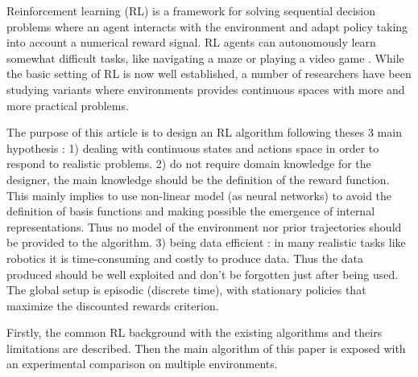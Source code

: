Reinforcement learning (RL) \cite{Sutton1998} is a framework for solving sequential decision
problems where an agent interacts with the environment and adapt   policy
taking into account a numerical reward signal. RL agents can autonomously
learn somewhat difficult tasks, like navigating a maze or playing a video game \cite{Tesauro1994}.
While the basic setting of RL is now well established, a number of researchers have been
studying variants where environments provides continuous spaces with more and more practical problems.

The purpose of this article is to design an RL algorithm following theses 3 main hypothesis :
1) dealing with continuous states and actions space in order to respond to realistic problems.
2) do not require domain knowledge for the designer, the main knowledge should be the definition of the reward function.
This mainly implies to use non-linear model (as neural networks) to avoid the definition of basis functions and
making possible the emergence of internal representations. Thus no model of the environment nor prior trajectories should
be provided to the algorithm.
3) being data efficient : in many realistic tasks like robotics it is time-consuming and costly to produce data.
Thus the data produced should be well exploited and don't be forgotten just after being used.
The global setup is episodic (discrete time), with stationary policies that maximize the
discounted rewards criterion.


Firstly, the common RL background with the existing algorithms and theirs limitations are described.
Then the main algorithm of this paper is exposed with an experimental comparison on multiple environments.
